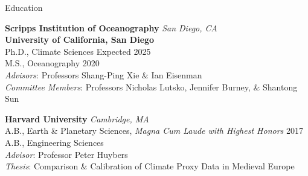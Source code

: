 \documentclass{resume} %
\begin{document}

\begin{rSection}{Education}

{\bf Scripps Institution of Oceanography}  \hfill {\textit{San Diego, CA}}\\
{\bf University of California, San Diego} \medskip \\
Ph.D., Climate Sciences \hfill {Expected 2025}\\
M.S., Oceanography \hfill {2020}\\
\textit{Advisors}: Professors Shang-Ping Xie \& Ian Eisenman \\
\textit{Committee Members}: Professors Nicholas Lutsko, Jennifer Burney, \& Shantong Sun \medskip

{\bf Harvard University} \hfill{\textit{Cambridge, MA}} \medskip \\
A.B., Earth \& Planetary Sciences, \textit{Magna Cum Laude with Highest Honors}  \hfill {2017} \\ \smallskip
A.B., Engineering Sciences  \\
\textit{Advisor}: Professor Peter Huybers \\ 
\textit{Thesis}: Comparison \& Calibration of Climate Proxy Data in Medieval Europe 
\end{rSection}

\end{document}

